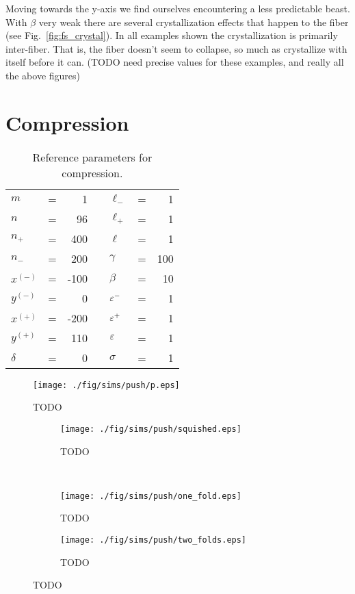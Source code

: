 Moving towards the y-axis we find ourselves encountering a less predictable beast. With $\beta$ very weak there are several crystallization effects that happen to the fiber (see Fig.~\ref{fig:fs_crystal}). In all examples shown the crystallization is primarily inter-fiber. That is, the fiber doesn't seem to collapse, so much as crystallize with itself before it can. (TODO need precise values for these examples, and really all the above figures)

\section{Compression}

	\begin{table}
		\centering
		\caption{Reference parameters for compression. \label{table:compression_reference}}
		\begin{tabular}{lcrclcr}
			$m$ & = & 1 & \hspace{1in} & $\ell_-$ & = & 1 \\
			$n$ & = & 96 & & $\ell_+$ & = & 1 \\
			$n_+$ & = & 400 & & $\ell$ & = & 1 \\
			$n_-$ & = & 200 & & $\gamma$ & = & 100 \\
			$x^{(-)}$ & = & -100 & & $\beta$ & = & 10 \\
			$y^{(-)}$ & = & 0 & & $\varepsilon^-$ & = & 1 \\
			$x^{(+)}$ & = & -200 & & $\varepsilon^+$ & = & 1 \\
			$y^{(+)}$ & = & 110 & & $\varepsilon$ & = & 1 \\
			$\delta$ & = & 0 & & $\sigma$ & = & 1
		\end{tabular}
	\end{table}

	\begin{figure}[t!]
		\begin{center}
			\texttt{[image: ./fig/sims/push/p.eps]}
		\end{center}		
		\caption{ TODO
		\label{fig:PushGrid:vanilla}}
	\end{figure}	
	
	\begin{figure*}
		\centering
		\begin{subfigure}{.5\textwidth}
			\centering
			\texttt{[image: ./fig/sims/push/squished.eps]}
			\caption{TODO\label{subfig:push_squished}}
		\end{subfigure}%
		~
		\begin{subfigure}{.5\textwidth}
			\centering
			\texttt{[image: ./fig/sims/push/one\_fold.eps]}
			\caption{TODO \label{subfig:push_one_fold}}
		\end{subfigure}

		\begin{subfigure}{.5\textwidth}
			\centering
			\texttt{[image: ./fig/sims/push/two\_folds.eps]}
			\caption{TODO\label{subfig:push_two_folds}}
		\end{subfigure}
		\caption{TODO\label{fig:push_fold}}
	\end{figure*}

